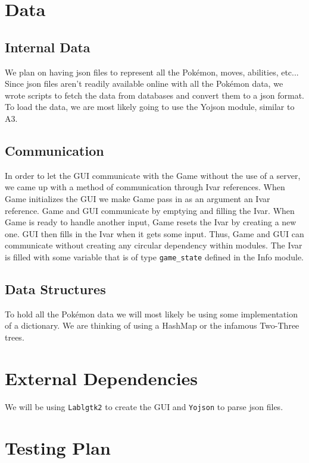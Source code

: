 \documentclass{scrreprt}
\begin{document}
\section{Data}
\subsection{Internal Data}
We plan on having json files to represent all the Pok\'emon, moves, abilities, etc... Since json files aren't readily available online with all the Pok\'emon data, we wrote scripts to fetch the data from databases and convert them to a json format. To load the data, we are most likely going to use the Yojson module, similar to A3. 

\subsection{Communication}
In order to let the GUI communicate with the Game without the use of a server, we came up with a method of communication through Ivar references. When Game initializes the GUI we make Game pass in as an argument an Ivar reference. Game and GUI communicate by emptying and filling the Ivar. When Game is ready to handle another input, Game resets the Ivar by creating a new one. GUI then fills in the Ivar when it gets some input. Thus, Game and GUI can communicate without creating any circular dependency within modules. The Ivar is filled with some variable that is of type \texttt{game\_state} defined in the Info module. 

\subsection{Data Structures}
To hold all the Pok\'emon data we will most likely be using some implementation of a dictionary. We are thinking of using a HashMap or the infamous Two-Three trees.

\section{External Dependencies}

We will be using \texttt{Lablgtk2} to create the GUI and \texttt{Yojson} to parse json files. 

\section{Testing Plan}

\end{document}
